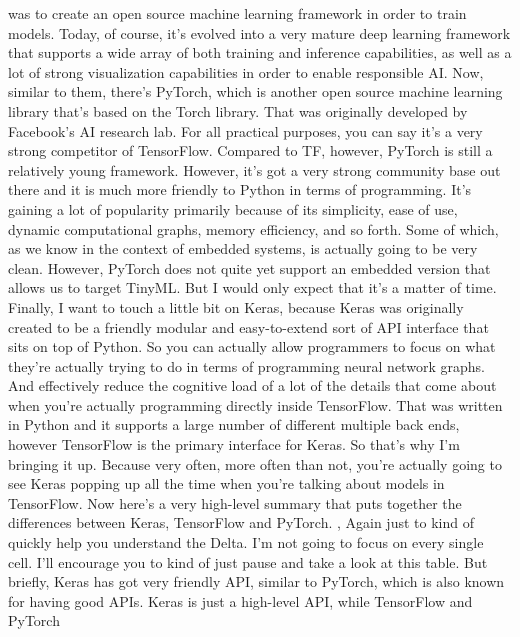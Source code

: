 {{{{{    was to create an open source machine learning framework
    in order to train models.
    Today, of course, it's evolved into a very mature deep learning
    framework that supports a wide array of both training and inference
    capabilities, as well as a lot of strong visualization capabilities
    in order to enable responsible AI.
    Now, similar to them, there's PyTorch, which
    is another open source machine learning library
    that's based on the Torch library.
    That was originally developed by Facebook's AI research lab.
    For all practical purposes, you can say it's
    a very strong competitor of TensorFlow.
    Compared to TF, however, PyTorch is still a relatively young framework.
    However, it's got a very strong community base out there
    and it is much more friendly to Python in terms of programming.
    It's gaining a lot of popularity primarily because of its simplicity,
    ease of use, dynamic computational graphs, memory efficiency,
    and so forth.
    Some of which, as we know in the context of embedded systems,
    is actually going to be very clean.
    However, PyTorch does not quite yet support an embedded version
    that allows us to target TinyML.
    But I would only expect that it's a matter of time.
    Finally,
    I want to touch a little bit on Keras, because Keras was originally
    created to be a friendly modular and easy-to-extend sort of API
    interface that sits on top of Python.
    So you can actually allow programmers to focus
    on what they're actually trying to do in terms of programming neural network
    graphs.
    And effectively reduce the cognitive load of a lot of the details
    that come about when you're actually programming directly inside TensorFlow.
    That was written in Python and it supports
    a large number of different multiple back ends,
    however TensorFlow is the primary interface for Keras.
    So that's why I'm bringing it up.
    Because very often, more often than not, you're
    actually going to see Keras popping up all the time when you're
    talking about models in TensorFlow.
    Now here's a very high-level summary that puts together the differences
    between Keras, TensorFlow and PyTorch. , Again just to kind of quickly help you
    understand the Delta.
    I'm not going to focus on every single cell.
    I'll encourage you to kind of just pause and take a look at this table.
    But briefly, Keras has got very friendly API, similar to PyTorch,
    which is also known for having good APIs.
    Keras is just a high-level API, while TensorFlow and PyTorch
}}}}}
